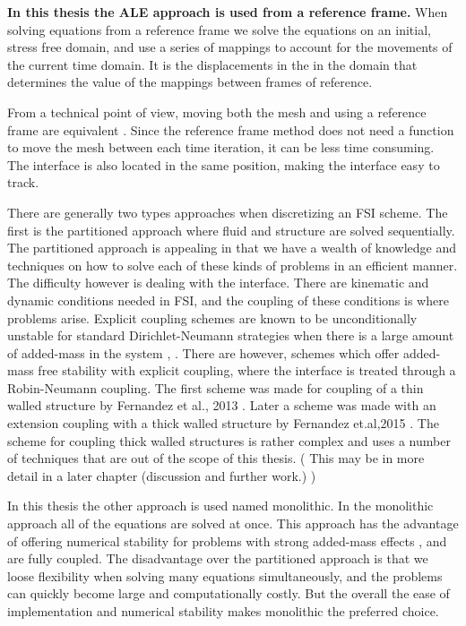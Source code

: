 \textbf{In this thesis the ALE approach is used from a reference frame.}
When solving equations from a reference frame we solve the equations on an initial, stress free domain, and use a series of mappings to account for the movements of the current time domain. It is the displacements in the in the domain that determines the value of the mappings between frames of reference. \newline

From a technical point of view, moving both the mesh and using a reference frame are equivalent \cite{Richter2016}. Since the reference frame method does not need a function to move the mesh between each time iteration, it can be less time consuming. The interface is also located in the same position, making the interface easy to track. \newline

There are generally two types approaches when discretizing an FSI scheme. The first is the partitioned approach where fluid and structure are solved sequentially.  The partitioned approach is appealing in that we have a wealth of knowledge and techniques on how to solve each of these kinds of problems in an efficient manner. The difficulty however is dealing with the interface. There are kinematic and dynamic conditions needed in FSI, and the coupling of these conditions is where problems arise. Explicit coupling schemes are known to be unconditionally unstable for standard Dirichlet-Neumann strategies when there is a large amount of added-mass in the system \cite{Fernandez2015}, \cite{VanBrummelen2009}. There are however, schemes which offer added-mass free stability with explicit coupling, where the interface is treated through a Robin-Neumann coupling. The first scheme was made for coupling of a thin walled structure by Fernandez et al., 2013 \cite{Fernandez2013}. Later a scheme was made with an extension coupling with a thick walled structure by Fernandez et.al,2015 \cite{Fernandez2015}. The scheme for coupling thick walled structures is rather complex and uses a number of techniques that are out of the scope of this thesis. ( This may be in more detail in a later chapter (discussion and further work.) ) \newline

In this thesis the other approach is used named monolithic. In the monolithic approach all of the equations are solved at once. This approach has the advantage of offering numerical stability for problems with strong added-mass effects \cite{Liu2014}, and are fully coupled. The disadvantage over the partitioned approach is that we loose flexibility when solving many equations simultaneously, and the problems can quickly become large and computationally costly. But the overall the ease of implementation and numerical stability makes monolithic the preferred choice. \newline

